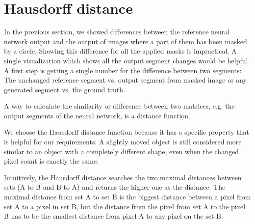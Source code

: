 \section{Hausdorff distance}
\label{hausdorff_distance_chapter}

In the previous section, we showed differences between the reference neural network output and the output of images where a part of them has been masked by a circle.
Showing this difference for all the applied masks is impractical. A single visualization which shows all the output segment changes would be helpful.
A first step is getting a single number for the difference between two segments: The unchanged reference segment vs. output segment from masked image or any generated segment vs. the ground truth.

A way to calculate the similarity or difference between two matrices, e.g. the output segments of the neural network, is a distance function.

We choose the Hausdorff distance function because it has a specific property that is helpful for our requirements: A slightly moved object is still considered more similar to
an object with a completely different shape, even when the changed pixel count is exactly the same.


Intuitively, the Hausdorff distance searches the two maximal distances between sets (A to B and B to A) and returns the higher one as the distance.
The maximal distance from set A to set B is the biggest distance between a pixel from set A to a pixel in set B, but the distance from the pixel from set A to the pixel B has to be the smallest distance from pixel A to any pixel on the set B.

